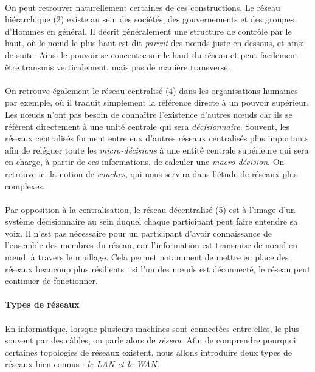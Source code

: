 \paragraph{} On peut retrouver naturellement certaines de ces constructions. Le réseau hiérarchique (2) existe
au sein des sociétés, des gouvernements et des groupes d'Hommes en général. Il décrit généralement une structure
de contrôle par le haut, où le n\oe{}ud le plus haut est dit \emph{parent} des n\oe{}uds juste en dessous, et ainsi de suite.
Ainsi le pouvoir se concentre sur le haut du réseau et peut facilement être transmis verticalement, mais pas de 
manière transverse.

\paragraph{} On retrouve également le réseau centralisé (4) dans les organisations humaines par exemple,
où il traduit simplement la référence directe à un pouvoir supérieur. Les n\oe{}uds n'ont pas besoin de connaître
l'existence d'autres n\oe{}uds car ils se réfèrent directement à une unité centrale qui sera \emph{décisionnaire}.
Souvent, les réseaux centralisés forment entre eux d'autres réseaux centralisés plus importants afin de reléguer
toute les \emph{micro-décisions} à une entité centrale supérieure qui sera en charge, à partir de ces informations,
de calculer une \emph{macro-décision}. On retrouve ici la notion de \emph{couches}, qui nous servira dans l'étude
de réseaux plus complexes.

\paragraph{} Par opposition à la centralisation, le réseau décentralisé (5) est à l'image d'un système décisionnaire au
sein duquel chaque participant peut faire entendre sa voix. Il n'est pas nécessaire pour un participant d'avoir connaissance
de l'ensemble des membres du réseau, car l'information est transmise de n\oe{}ud en n\oe{}ud, à travers le maillage.
Cela permet notamment de mettre en place des réseaux beaucoup plus résilients : si l'un des n\oe{}uds est déconnecté,
le réseau peut continuer de fonctionner.


\paragraph{Types de réseaux}

\paragraph{} En informatique, lorsque plusieurs machines sont connectées entre elles, le plus souvent par des câbles, on
parle alors de \emph{réseau}. Afin de comprendre pourquoi certaines topologies de réseaux existent, nous allons introduire 
deux types de réseaux bien connus : \emph{le LAN et le WAN}.

